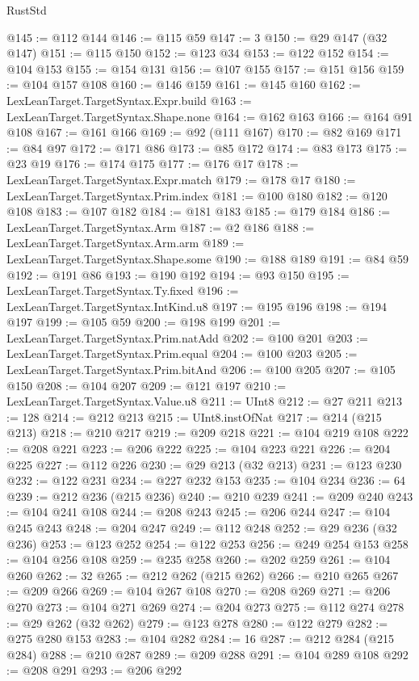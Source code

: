 \begin{lexlean}{RustStd}
\begin{coremodule}
{\begin{coremodule}
{{{{{{{{{{{{{{{{{{{{{{{{{{{{{{{{{{{{{{{{{{{{{{{{{{{{{{{@145 := @112 @144
@146 := @115 @59
@147 := 3
@150 := @29 @147 (@32 @147)
@151 := @115 @150
@152 := @123 @34
@153 := @122 @152
@154 := @104 @153
@155 := @154 @131
@156 := @107 @155
@157 := @151 @156
@159 := @104 @157 @108
@160 := @146 @159
@161 := @145 @160
@162 := LexLeanTarget.TargetSyntax.Expr.build
@163 := LexLeanTarget.TargetSyntax.Shape.none
@164 := @162 @163
@166 := @164 @91 @108
@167 := @161 @166
@169 := @92 (@111 @167)
@170 := @82 @169
@171 := @84 @97
@172 := @171 @86
@173 := @85 @172
@174 := @83 @173
@175 := @23 @19
@176 := @174 @175
@177 := @176 @17
@178 := LexLeanTarget.TargetSyntax.Expr.match
@179 := @178 @17
@180 := LexLeanTarget.TargetSyntax.Prim.index
@181 := @100 @180
@182 := @120 @108
@183 := @107 @182
@184 := @181 @183
@185 := @179 @184
@186 := LexLeanTarget.TargetSyntax.Arm
@187 := @2 @186
@188 := LexLeanTarget.TargetSyntax.Arm.arm
@189 := LexLeanTarget.TargetSyntax.Shape.some
@190 := @188 @189
@191 := @84 @59
@192 := @191 @86
@193 := @190 @192
@194 := @93 @150
@195 := LexLeanTarget.TargetSyntax.Ty.fixed
@196 := LexLeanTarget.TargetSyntax.IntKind.u8
@197 := @195 @196
@198 := @194 @197
@199 := @105 @59
@200 := @198 @199
@201 := LexLeanTarget.TargetSyntax.Prim.natAdd
@202 := @100 @201
@203 := LexLeanTarget.TargetSyntax.Prim.equal
@204 := @100 @203
@205 := LexLeanTarget.TargetSyntax.Prim.bitAnd
@206 := @100 @205
@207 := @105 @150
@208 := @104 @207
@209 := @121 @197
@210 := LexLeanTarget.TargetSyntax.Value.u8
@211 := UInt8
@212 := @27 @211
@213 := 128
@214 := @212 @213
@215 := UInt8.instOfNat
@217 := @214 (@215 @213)
@218 := @210 @217
@219 := @209 @218
@221 := @104 @219 @108
@222 := @208 @221
@223 := @206 @222
@225 := @104 @223 @221
@226 := @204 @225
@227 := @112 @226
@230 := @29 @213 (@32 @213)
@231 := @123 @230
@232 := @122 @231
@234 := @227 @232 @153
@235 := @104 @234
@236 := 64
@239 := @212 @236 (@215 @236)
@240 := @210 @239
@241 := @209 @240
@243 := @104 @241 @108
@244 := @208 @243
@245 := @206 @244
@247 := @104 @245 @243
@248 := @204 @247
@249 := @112 @248
@252 := @29 @236 (@32 @236)
@253 := @123 @252
@254 := @122 @253
@256 := @249 @254 @153
@258 := @104 @256 @108
@259 := @235 @258
@260 := @202 @259
@261 := @104 @260
@262 := 32
@265 := @212 @262 (@215 @262)
@266 := @210 @265
@267 := @209 @266
@269 := @104 @267 @108
@270 := @208 @269
@271 := @206 @270
@273 := @104 @271 @269
@274 := @204 @273
@275 := @112 @274
@278 := @29 @262 (@32 @262)
@279 := @123 @278
@280 := @122 @279
@282 := @275 @280 @153
@283 := @104 @282
@284 := 16
@287 := @212 @284 (@215 @284)
@288 := @210 @287
@289 := @209 @288
@291 := @104 @289 @108
@292 := @208 @291
@293 := @206 @292
}}}}}}}}}}}}}}}}}}}}}}}}}}}}}}}}}}}}}}}}}}}}}}}}}}}}}}}
\end{coremodule}}
\end{coremodule}
\end{lexlean}
